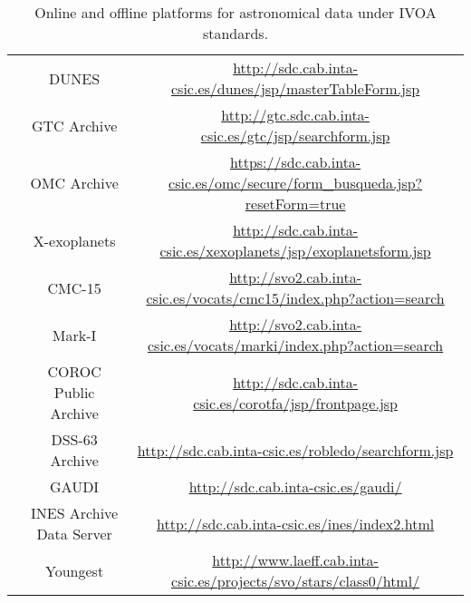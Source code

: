 \begin{table}
\begin{tabular}{c|c|c}
    \cline{2-3}
    & DUNES
    & \url{http://sdc.cab.inta-csic.es/dunes/jsp/masterTableForm.jsp} \\
    \cline{2-3}
    & GTC Archive
    & \url{http://gtc.sdc.cab.inta-csic.es/gtc/jsp/searchform.jsp} \\
    \cline{2-3}
    & OMC Archive
    &
    \url{https://sdc.cab.inta-csic.es/omc/secure/form_busqueda.jsp?resetForm=true}
    \\
    \cline{2-3}
    & X-exoplanets
    & \url{http://sdc.cab.inta-csic.es/xexoplanets/jsp/exoplanetsform.jsp} \\
    \cline{2-3}
    & CMC-15
    & \url{http://svo2.cab.inta-csic.es/vocats/cmc15/index.php?action=search} \\
    \cline{2-3}
    & Mark-I
    & \url{http://svo2.cab.inta-csic.es/vocats/marki/index.php?action=search} \\
    \cline{2-3}
    & COROC Public Archive
    & \url{http://sdc.cab.inta-csic.es/corotfa/jsp/frontpage.jsp} \\
    \cline{2-3}
    & DSS-63 Archive
    & \url{http://sdc.cab.inta-csic.es/robledo/searchform.jsp} \\
    \cline{2-3}
    & GAUDI
    & \url{http://sdc.cab.inta-csic.es/gaudi/} \\
    \cline{2-3}
    & INES Archive Data Server
    & \url{http://sdc.cab.inta-csic.es/ines/index2.html} \\
    \cline{2-3}
    & Youngest
    & \url{http://www.laeff.cab.inta-csic.es/projects/svo/stars/class0/html/} \\
    \hline
 \end{tabular}
\caption{Online and offline platforms for astronomical data under IVOA
         standards.}
\label{table:vo_platforms}
 \end{table}

